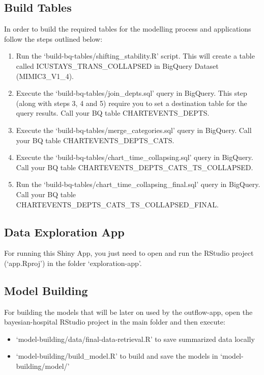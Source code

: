 \documentclass[12pt]{article}
\begin{document}
\subsection*{Build Tables}

In order to build the required tables for the modelling process and applications follow the steps outlined below: 
\begin{enumerate}
	\item  Run the `build-bq-tables/shifting\_stability.R' script. This will create a table called ICUSTAYS\_TRANS\_COLLAPSED in BigQuery Dataset (MIMIC3\_V1\_4).
	\item Execute the `build-bq-tables/join\_depts.sql' query in BigQuery. This step (along with steps 3, 4 and 5) require you to set a destination table for the query results. Call your BQ table CHARTEVENTS\_DEPTS.
	\item  Execute the `build-bq-tables/merge\_categories.sql' query in BigQuery. Call your BQ table CHARTEVENTS\_DEPTS\_CATS.
	\item  Execute the `build-bq-tables/chart\_time\_collapsing.sql'  query in BigQuery. Call your BQ table CHARTEVENTS\_DEPTS\_CATS\_TS\_COLLAPSED.
	\item  Run the `build-bq-tables/chart\_time\_collapsing\_final.sql' query in BigQuery. Call your BQ table CHARTEVENTS\_DEPTS\_CATS\_TS\_COLLAPSED\_FINAL.
\end{enumerate} 


\subsection*{Data Exploration App}

For running this Shiny App, you just need to open and run the RStudio project (`app.Rproj') in the folder `exploration-app'.

\subsection*{Model Building}

For building the models that will be later on used by the outflow-app, open the bayesian-hospital RStudio project in the main folder and then execute:

\begin{itemize}
	\item `model-building/data/final-data-retrieval.R' to save summarized data locally 
	\item `model-building/build\_model.R' to build and save the models in `model-building/model/'
\end{itemize} 
\end{document}
